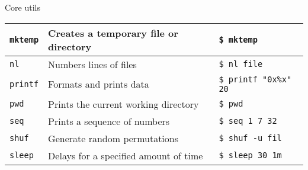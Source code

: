 \documentclass{beamer}
\let\tt\texttt
\begin{document}
\begin{frame}{Core utils}
        \begin{tabular}{p{} p{} | p{}}
                \hline
                \tt{mktemp}             &
                Creates a temporary file or directory &
                \tt{\$ mktemp }       \\
                \hline
                \tt{nl}             &
                Numbers lines of files &
                \tt{\$ nl file}       \\
                \hline
                \tt{printf}             &
                Formats and prints data  &
                \tt{\$ printf "0x\%x" 20}       \\
                \hline
                \tt{pwd}             &
                Prints the current working directory &
                \tt{\$ pwd}       \\
                \hline
                \tt{seq}             &
                Prints a sequence of numbers  &
                \tt{\$ seq 1 7 32}       \\
                \hline
                \tt{shuf}             &
                Generate random permutations &
                \tt{\$ shuf -u fil}       \\
                \hline
                \tt{sleep}             &
                Delays for a specified amount of time &
                \tt{\$ sleep 30 1m}       \\
                \hline
        \end{tabular}
\end{frame}
\end{document}
